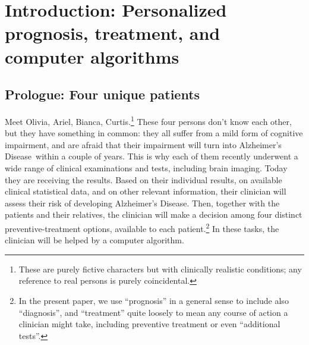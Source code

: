 \documentclass[utf8]{FrontiersinHarvard} %
\renewcommand*{\|}[1][]{\nonscript\:#1\vert\nonscript\:\mathopen{}}
\newcommand*{\ad}{Alzheimer's Disease}
\begin{document}
\newpage
\section{Introduction: Personalized prognosis, treatment, and computer algorithms}
\label{sec:intro}

\setcounter{subsection}{-1}
\subsection{Prologue: Four unique patients} %
\label{sec:four_patients}

Meet Olivia, Ariel, Bianca, Curtis.\footnote{These are purely fictive characters but with clinically realistic conditions; any reference to real persons is purely coincidental.}
These four persons don't know each other, but they have something in common: they all suffer from a mild form of cognitive impairment, and are afraid that their impairment will turn into \ad\ within a couple of years. This is why each of them recently underwent a wide range of clinical examinations and tests, including brain imaging. %
Today they are receiving the results. Based on their individual results, on available clinical statistical data, and on other relevant information, their clinician will 
assess their risk of developing \ad. Then, together with the patients and their relatives, the clinician will make a decision among four distinct preventive-treatment options, available to each patient.\footnote{\label{fn:treatment}In the present paper, we use \enquote{prognosis} in a general sense to include also \enquote{diagnosis}, and \enquote{treatment} quite loosely to mean any course of action a clinician might take, including preventive treatment or even \enquote{additional tests}.} In these tasks, the clinician will be helped by a computer algorithm.
\end{document}
